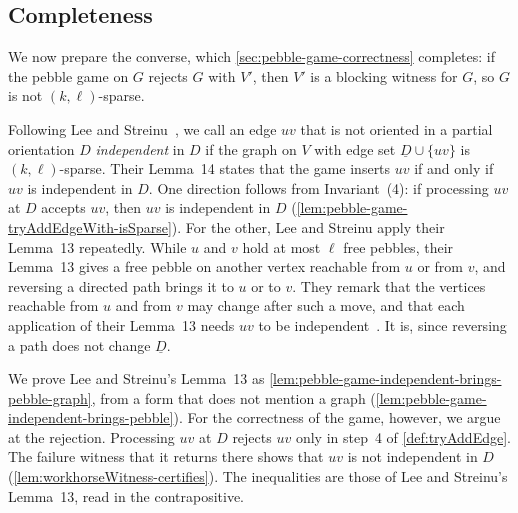 \subsection{Completeness}
\label{sec:pebble-game-completeness}

We now prepare the converse, which \cref{sec:pebble-game-correctness}
completes: if the pebble game on $G$ rejects $G$ with $V'$, then $V'$
is a blocking witness for $G$, so $G$ is not $(k, \ell)$-sparse.

Following Lee and Streinu~\cite[\S 2]{leeStreinu2008}, we call an edge
$uv$ that is not oriented in a partial orientation $D$
\emph{independent} in $D$ if the graph on $V$ with edge set
$\underline{D} \cup \{uv\}$ is $(k, \ell)$-sparse. Their Lemma~14
states that the game inserts $uv$ if and only if $uv$ is independent in
$D$. One direction follows from Invariant~(4): if processing $uv$ at
$D$ accepts $uv$, then $uv$ is independent in $D$
(\cref{lem:pebble-game-tryAddEdgeWith-isSparse}).
For the other, Lee and Streinu apply their Lemma~13 repeatedly. While
$u$ and $v$ hold at most $\ell$ free pebbles, their Lemma~13 gives a
free pebble on another vertex reachable from $u$ or from $v$, and
reversing a directed path brings it to $u$ or to $v$. They remark that
the vertices reachable from $u$ and from $v$ may change after such a
move, and that each application of their Lemma~13 needs $uv$ to be
independent~\cite[p.~1433]{leeStreinu2008}. It is, since reversing a
path does not change $\underline{D}$.

We prove Lee and Streinu's Lemma~13 as
\cref{lem:pebble-game-independent-brings-pebble-graph}, from a form
that does not mention a graph
(\cref{lem:pebble-game-independent-brings-pebble}). For the correctness
of the game, however, we argue at the rejection. Processing $uv$ at $D$
rejects $uv$ only in step~4 of \cref{def:tryAddEdge}. The failure
witness that it returns there shows that $uv$ is not independent in $D$
(\cref{lem:workhorseWitness-certifies}). The inequalities are those of
Lee and Streinu's Lemma~13, read in the contrapositive.

